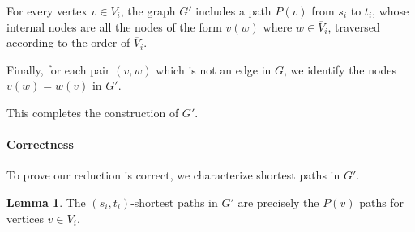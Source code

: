 \documentclass[11pt]{article}
\renewcommand{\bar}{\overline}
\theoremstyle{definition}
\newtheorem{lemma}[theorem]{Lemma}
\begin{document}
For every vertex $v\in V_i$, the graph $G'$ includes a path $P(v)$ from $s_i$ to $t_i$, whose internal nodes are all the nodes  of the form $v(w)$ where $w\in\bar{V}_i$, traversed according to the order of $\bar{V}_i$.

Finally, for each pair $(v,w)$ which is not an edge in $G$, we identify the nodes $v(w)=w(v)$ in $G'$.

This completes the construction of $G'$.

\paragraph{Correctness}

To prove our reduction is correct, we characterize shortest paths in $G'$.

\begin{lemma}
\label{canonical-sp}
    The $(s_i,t_i)$-shortest paths in $G'$ are precisely the $P(v)$ paths for vertices $v\in V_i$.
\end{lemma}
\end{document}
